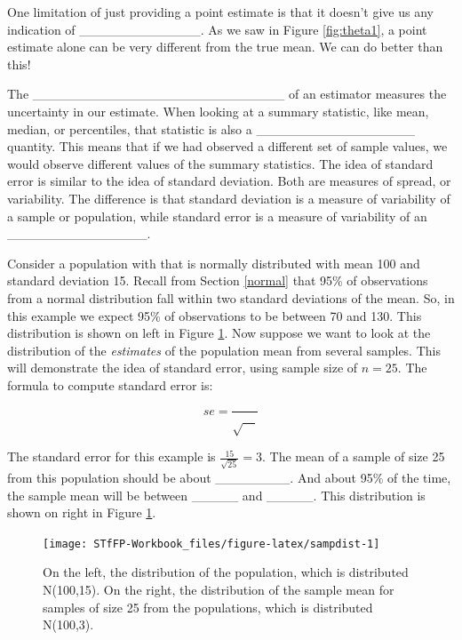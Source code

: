\documentclass[]{book}
\theoremstyle{definition}
\theoremstyle{definition}
\theoremstyle{remark}
\begin{document}
One limitation of just providing a point estimate is that it doesn't
give us any indication of \_\_\_\_\_\_\_\_\_\_\_\_\_. As we saw in
Figure \ref{fig:theta1}, a point estimate alone can be very different
from the true mean. We can do better than this!

The \_\_\_\_\_\_\_\_\_\_\_\_\_\_\_\_\_\_\_\_\_\_\_\_\_\_\_ of an
estimator measures the uncertainty in our estimate. When looking at a
summary statistic, like mean, median, or percentiles, that statistic is
also a \_\_\_\_\_\_\_\_\_\_\_\_\_\_\_\_\_ quantity. This means that if
we had observed a different set of sample values, we would observe
different values of the summary statistics. The idea of standard error
is similar to the idea of standard deviation. Both are measures of
spread, or variability. The difference is that standard deviation is a
measure of variability of a sample or population, while standard error
is a measure of variability of an \_\_\_\_\_\_\_\_\_\_\_\_\_\_\_.

Consider a population with that is normally distributed with mean 100
and standard deviation 15. Recall from Section \ref{normal} that 95\% of
observations from a normal distribution fall within two standard
deviations of the mean. So, in this example we expect 95\% of
observations to be between 70 and 130. This distribution is shown on
left in Figure \ref{fig:sampdist}. Now suppose we want to look at the
distribution of the \emph{estimates} of the population mean from several
samples. This will demonstrate the idea of standard error, using sample
size of \(n=25\). The formula to compute standard error is:

\[se = \frac{}{\sqrt{\quad}}\]

The standard error for this example is \(\frac{15}{\sqrt{25}} = 3\). The
mean of a sample of size 25 from this population should be about
\_\_\_\_\_\_\_\_. And about 95\% of the time, the sample mean will be
between \_\_\_\_\_ and \_\_\_\_\_. This distribution is shown on right
in Figure \ref{fig:sampdist}.

\begin{figure}[h]

{\centering \texttt{[image: STfFP-Workbook\_files/figure-latex/sampdist-1]} 

}

\caption{On the left, the distribution of the population, which is distributed N(100,15). On the right, the distribution of the sample mean for samples of size 25 from the populations, which is distributed N(100,3).}\label{fig:sampdist}
\end{figure}
\end{document}
